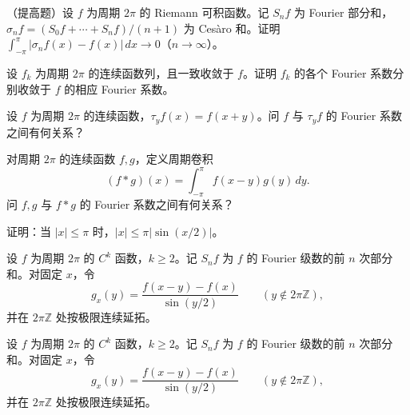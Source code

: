 \noindent\begin{minipage}{\textwidth}
（提高题）设 $f$ 为周期 $2\pi$ 的 Riemann 可积函数。记 $S_nf$ 为 Fourier 部分和，$\sigma_nf=(S_0f+\cdots+S_nf)/(n+1)$ 为 Cesàro 和。证明 $\int_{-\pi}^{\pi}|\sigma_nf(x)-f(x)|\,dx\to0$（$n\to\infty$）。
\end{minipage}\par\vfill
\noindent\begin{minipage}{\textwidth}
设 $f_k$ 为周期 $2\pi$ 的连续函数列，且一致收敛于 $f$。证明 $f_k$ 的各个 Fourier 系数分别收敛于 $f$ 的相应 Fourier 系数。
\end{minipage}\par\vfill
\newpage
\noindent\begin{minipage}{\textwidth}
设 $f$ 为周期 $2\pi$ 的连续函数，$\tau_yf(x)=f(x+y)$。问 $f$ 与 $\tau_yf$ 的 Fourier 系数之间有何关系？
\end{minipage}\par\vfill
\noindent\begin{minipage}{\textwidth}
对周期 $2\pi$ 的连续函数 $f,g$，定义周期卷积\[(f*g)(x)=\int_{-\pi}^{\pi}f(x-y)g(y)\,dy.\]问 $f,g$ 与 $f*g$ 的 Fourier 系数之间有何关系？
\end{minipage}\par\vfill
\noindent\begin{minipage}{\textwidth}
证明：当 $|x|\le\pi$ 时，$|x|\le\pi|\sin(x/2)|$。
\end{minipage}\par\vfill
\newpage
\noindent\begin{minipage}{\textwidth}
设 $f$ 为周期 $2\pi$ 的 $C^k$ 函数，$k\ge2$。记 $S_nf$ 为 $f$ 的 Fourier 级数的前 $n$ 次部分和。对固定 $x$，令\[g_x(y)=\frac{f(x-y)-f(x)}{\sin(y/2)}\qquad(y\notin2\pi\mathbb Z),\]并在 $2\pi\mathbb Z$ 处按极限连续延拓。
\end{minipage}\par\vfill
\newpage
\noindent\begin{minipage}{\textwidth}
设 $f$ 为周期 $2\pi$ 的 $C^k$ 函数，$k\ge2$。记 $S_nf$ 为 $f$ 的 Fourier 级数的前 $n$ 次部分和。对固定 $x$，令\[g_x(y)=\frac{f(x-y)-f(x)}{\sin(y/2)}\qquad(y\notin2\pi\mathbb Z),\]并在 $2\pi\mathbb Z$ 处按极限连续延拓。
\end{minipage}\par\vfill
